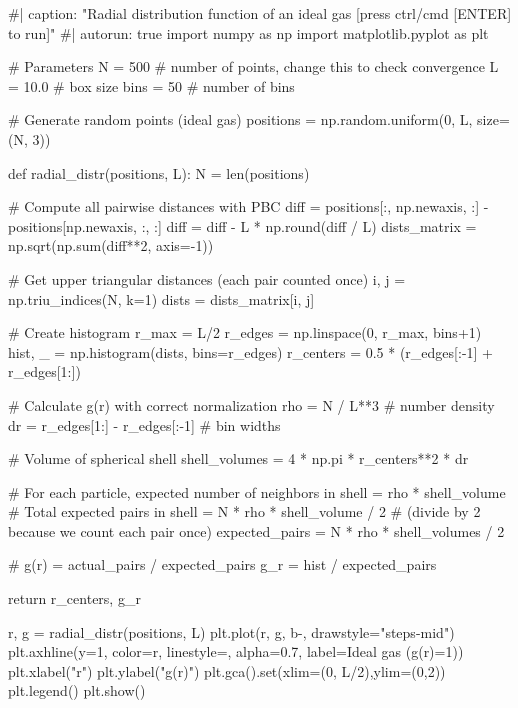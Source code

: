 \documentclass[
  letterpaper,
  enabledeprecatedfontcommands]{report}
\newenvironment{Shaded}{\begin{snugshade}}{\end{snugshade}}
\newcommand{\NormalTok}[1]{\textcolor[rgb]{0.00,0.23,0.31}{#1}}
\begin{document}
\begin{Shaded}
\begin{Highlighting}[]
\NormalTok{\#| caption: "Radial distribution function of an ideal gas [press ctrl/cmd [ENTER] to run]"}
\NormalTok{\#| autorun: true}
\NormalTok{import numpy as np}
\NormalTok{import matplotlib.pyplot as plt}

\NormalTok{\# Parameters}
\NormalTok{N = 500      \# number of points, change this to check convergence}
\NormalTok{L = 10.0     \# box size}
\NormalTok{bins = 50    \# number of bins}

\NormalTok{\# Generate random points (ideal gas)}
\NormalTok{positions = np.random.uniform(0, L, size=(N, 3))}

\NormalTok{def radial\_distr(positions, L):}
\NormalTok{    N = len(positions)}
    
\NormalTok{    \# Compute all pairwise distances with PBC}
\NormalTok{    diff = positions[:, np.newaxis, :] {-} positions[np.newaxis, :, :]}
\NormalTok{    diff = diff {-} L * np.round(diff / L)}
\NormalTok{    dists\_matrix = np.sqrt(np.sum(diff**2, axis={-}1))}
    
\NormalTok{    \# Get upper triangular distances (each pair counted once)}
\NormalTok{    i, j = np.triu\_indices(N, k=1)}
\NormalTok{    dists = dists\_matrix[i, j]}
    
\NormalTok{    \# Create histogram}
\NormalTok{    r\_max = L/2}
\NormalTok{    r\_edges = np.linspace(0, r\_max, bins+1)}
\NormalTok{    hist, \_ = np.histogram(dists, bins=r\_edges)}
\NormalTok{    r\_centers = 0.5 * (r\_edges[:{-}1] + r\_edges[1:])}
    
\NormalTok{    \# Calculate g(r) with correct normalization}
\NormalTok{    rho = N / L**3  \# number density}
\NormalTok{    dr = r\_edges[1:] {-} r\_edges[:{-}1]  \# bin widths}
    
\NormalTok{    \# Volume of spherical shell}
\NormalTok{    shell\_volumes = 4 * np.pi * r\_centers**2 * dr}
    
\NormalTok{    \# For each particle, expected number of neighbors in shell = rho * shell\_volume}
\NormalTok{    \# Total expected pairs in shell = N * rho * shell\_volume / 2 }
\NormalTok{    \# (divide by 2 because we count each pair once)}
\NormalTok{    expected\_pairs = N * rho * shell\_volumes / 2}
    
\NormalTok{    \# g(r) = actual\_pairs / expected\_pairs}
\NormalTok{    g\_r = hist / expected\_pairs}
    
\NormalTok{    return r\_centers, g\_r}

\NormalTok{r, g = radial\_distr(positions, L)}
\NormalTok{plt.plot(r, g, \textquotesingle{}b{-}\textquotesingle{}, drawstyle="steps{-}mid")}
\NormalTok{plt.axhline(y=1, color=\textquotesingle{}r\textquotesingle{}, linestyle=\textquotesingle{}{-}{-}\textquotesingle{}, alpha=0.7, label=\textquotesingle{}Ideal gas (g(r)=1)\textquotesingle{})}
\NormalTok{plt.xlabel("r")}
\NormalTok{plt.ylabel("g(r)")}
\NormalTok{plt.gca().set(xlim=(0, L/2),ylim=(0,2))}
\NormalTok{plt.legend()}
\NormalTok{plt.show()}
\end{Highlighting}
\end{Shaded}
\end{document}
